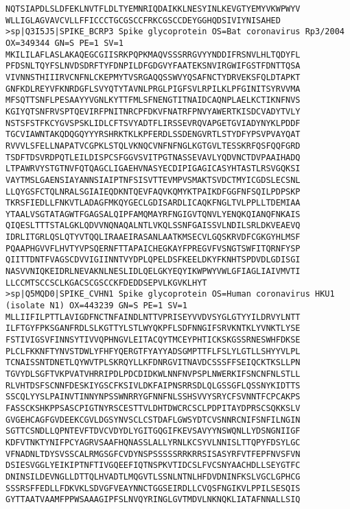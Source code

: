 \documentclass[en,black,12pt,normal]{elegantnote}
\begin{document}
\begin{lstlisting}
NQTSIAPDLSLDFEKLNVTFLDLTYEMNRIQDAIKKLNESYINLKEVGTYEMYVKWPWYV
WLLIGLAGVAVCVLLFFICCCTGCGSCCFRKCGSCCDEYGGHQDSIVIYNISAHED
>sp|Q3I5J5|SPIKE_BCRP3 Spike glycoprotein OS=Bat coronavirus Rp3/2004 OX=349344 GN=S PE=1 SV=1
MKILILAFLASLAKAQEGCGIISRKPQPKMAQVSSSRRGVYYNDDIFRSNVLHLTQDYFL
PFDSNLTQYFSLNVDSDRFTYFDNPILDFGDGVYFAATEKSNVIRGWIFGSTFDNTTQSA
VIVNNSTHIIIRVCNFNLCKEPMYTVSRGAQQSSWVYQSAFNCTYDRVEKSFQLDTAPKT
GNFKDLREYVFKNRDGFLSVYQTYTAVNLPRGLPIGFSVLRPILKLPFGINITSYRVVMA
MFSQTTSNFLPESAAYYVGNLKYTTFMLSFNENGTITNAIDCAQNPLAELKCTIKNFNVS
KGIYQTSNFRVSPTQEVIRFPNITNRCPFDKVFNATRFPNVYAWERTKISDCVADYTVLY
NSTSFSTFKCYGVSPSKLIDLCFTSVYADTFLIRSSEVRQVAPGETGVIADYNYKLPDDF
TGCVIAWNTAKQDQGQYYYRSHRKTKLKPFERDLSSDENGVRTLSTYDFYPSVPVAYQAT
RVVVLSFELLNAPATVCGPKLSTQLVKNQCVNFNFNGLKGTGVLTESSKRFQSFQQFGRD
TSDFTDSVRDPQTLEILDISPCSFGGVSVITPGTNASSEVAVLYQDVNCTDVPAAIHADQ
LTPAWRVYSTGTNVFQTQAGCLIGAEHVNASYECDIPIGAGICASYHTASTLRSVGQKSI
VAYTMSLGAENSIAYANNSIAIPTNFSISVTTEVMPVSMAKTSVDCTMYICGDSLECSNL
LLQYGSFCTQLNRALSGIAIEQDKNTQEVFAQVKQMYKTPAIKDFGGFNFSQILPDPSKP
TKRSFIEDLLFNKVTLADAGFMKQYGECLGDISARDLICAQKFNGLTVLPPLLTDEMIAA
YTAALVSGTATAGWTFGAGSALQIPFAMQMAYRFNGIGVTQNVLYENQKQIANQFNKAIS
QIQESLTTTSTALGKLQDVVNQNAQALNTLVKQLSSNFGAISSVLNDILSRLDKVEAEVQ
IDRLITGRLQSLQTYVTQQLIRAAEIRASANLAATKMSECVLGQSKRVDFCGKGYHLMSF
PQAAPHGVVFLHVTYVPSQERNFTTAPAICHEGKAYFPREGVFVSNGTSWFITQRNFYSP
QIITTDNTFVAGSCDVVIGIINNTVYDPLQPELDSFKEELDKYFKNHTSPDVDLGDISGI
NASVVNIQKEIDRLNEVAKNLNESLIDLQELGKYEQYIKWPWYVWLGFIAGLIAIVMVTI
LLCCMTSCCSCLKGACSCGSCCKFDEDDSEPVLKGVKLHYT
>sp|Q5MQD0|SPIKE_CVHN1 Spike glycoprotein OS=Human coronavirus HKU1 (isolate N1) OX=443239 GN=S PE=1 SV=1
MLLIIFILPTTLAVIGDFNCTNFAINDLNTTVPRISEYVVDVSYGLGTYYILDRVYLNTT
ILFTGYFPKSGANFRDLSLKGTTYLSTLWYQKPFLSDFNNGIFSRVKNTKLYVNKTLYSE
FSTIVIGSVFINNSYTIVVQPHNGVLEITACQYTMCEYPHTICKSKGSSRNESWHFDKSE
PLCLFKKNFTYNVSTDWLYFHFYQERGTFYAYYADSGMPTTFLFSLYLGTLLSHYYVLPL
TCNAISSNTDNETLQYWVTPLSKRQYLLKFDNRGVITNAVDCSSSFFSEIQCKTKSLLPN
TGVYDLSGFTVKPVATVHRRIPDLPDCDIDKWLNNFNVPSPLNWERKIFSNCNFNLSTLL
RLVHTDSFSCNNFDESKIYGSCFKSIVLDKFAIPNSRRSDLQLGSSGFLQSSNYKIDTTS
SSCQLYYSLPAINVTINNYNPSSWNRRYGFNNFNLSSHSVVYSRYCFSVNNTFCPCAKPS
FASSCKSHKPPSASCPIGTNYRSCESTTVLDHTDWCRCSCLPDPITAYDPRSCSQKKSLV
GVGEHCAGFGVDEEKCGVLDGSYNVSCLCSTDAFLGWSYDTCVSNNRCNIFSNFILNGIN
SGTTCSNDLLQPNTEVFTDVCVDYDLYGITGQGIFKEVSAVYYNSWQNLLYDSNGNIIGF
KDFVTNKTYNIFPCYAGRVSAAFHQNASSLALLYRNLKCSYVLNNISLTTQPYFDSYLGC
VFNADNLTDYSVSSCALRMGSGFCVDYNSPSSSSSRRKRRSISASYRFVTFEPFNVSFVN
DSIESVGGLYEIKIPTNFTIVGQEEFIQTNSPKVTIDCSLFVCSNYAACHDLLSEYGTFC
DNINSILDEVNGLLDTTQLHVADTLMQGVTLSSNLNTNLHFDVDNINFKSLVGCLGPHCG
SSSRSFFEDLLFDKVKLSDVGFVEAYNNCTGGSEIRDLLCVQSFNGIKVLPPILSESQIS
GYTTAATVAAMFPPWSAAAGIPFSLNVQYRINGLGVTMDVLNKNQKLIATAFNNALLSIQ

\end{lstlisting}
\end{document}
